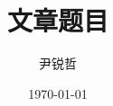 \documentclass[a4paper,notitlepage,UTF8,zihao=5,onecolumn]{article}
\begin{document}
	\title{文章题目\vspace{0pt}}
	\author{尹锐哲}
	\date{\today}
	
	\maketitle
	

	\section{}
	\subsection{}
	\section{}
\end{document}
